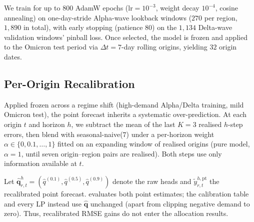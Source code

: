 We train for up to $800$ AdamW epochs ($\text{lr}=10^{-3}$, weight decay
$10^{-4}$, cosine annealing) on one-day-stride Alpha-wave lookback
windows ($270$ per region, $1{,}890$ in total), with early stopping
(patience $80$) on the $1{,}134$ Delta-wave validation windows' pinball
loss. Once
selected, the model is frozen and applied to the Omicron test period via
$\Delta t = 7$-day rolling origins, yielding $32$ origin dates.

\subsection{Per-Origin Recalibration}\label{ssec:recal}
Applied frozen across a regime shift (high-demand Alpha/Delta training,
mild Omicron test), the point forecast inherits a systematic
over-prediction. At each origin $t$ and horizon $h$, we subtract the mean
of the last $K{=}3$ realised $h$-step errors, then blend with
seasonal-naive($7$) under a per-horizon weight
$\alpha\in\{0,0.1,\dots,1\}$ fitted on an expanding window of realised
origins (pure model, $\alpha{=}1$, until seven origin–region pairs are
realised). Both steps use only information available at $t$.

Let $\hat{\mathbf q}_{r,t}^{h}=(\hat q^{(0.1)},\hat q^{(0.5)},
\hat q^{(0.9)})$ denote the raw heads and
$\tilde y_{r,t}^{h,\mathrm{pt}}$ the recalibrated point forecast.
 evaluates both point estimates; the
calibration table and every LP instead use $\hat{\mathbf q}$ unchanged
(apart from clipping negative demand to zero). Thus, recalibrated RMSE
gains do not enter the allocation results.
